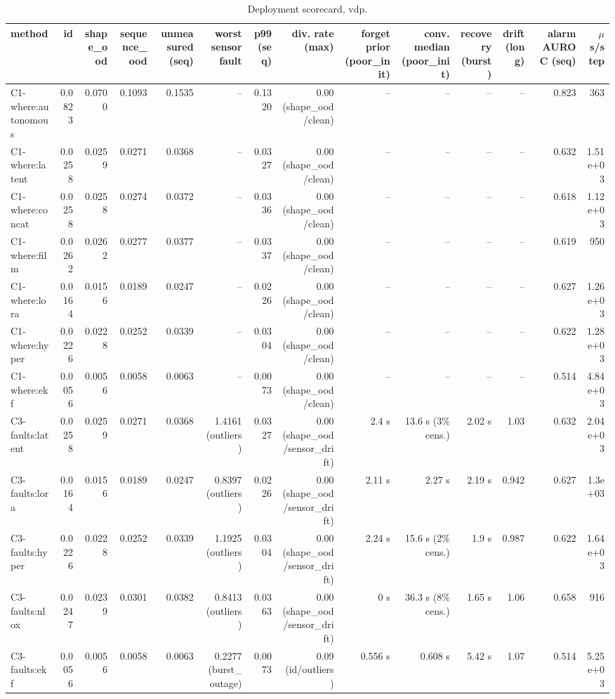 \begin{table}[t]
\centering
\scriptsize
\caption{Deployment scorecard, vdp.}
\begin{tabular}{lrrrrrrrrrrrrr}
\toprule
method & id & shape\_ood & sequence\_ood & unmeasured (seq) & worst sensor fault & p99 (seq) & div. rate (max) & forget prior (poor\_init) & conv. median (poor\_init) & recovery (burst) & drift (long) & alarm AUROC (seq) & $\mu$s/step \\
\midrule
C1-where:autonomous & 0.0823 & 0.0700 & 0.1093 & 0.1535 & – & 0.1320 & 0.00 (shape\_ood/clean) & – & – & – & – & 0.823 & 363 \\
C1-where:latent & 0.0258 & 0.0259 & 0.0271 & 0.0368 & – & 0.0327 & 0.00 (shape\_ood/clean) & – & – & – & – & 0.632 & 1.51e+03 \\
C1-where:concat & 0.0258 & 0.0258 & 0.0274 & 0.0372 & – & 0.0336 & 0.00 (shape\_ood/clean) & – & – & – & – & 0.618 & 1.12e+03 \\
C1-where:film & 0.0262 & 0.0262 & 0.0277 & 0.0377 & – & 0.0337 & 0.00 (shape\_ood/clean) & – & – & – & – & 0.619 & 950 \\
C1-where:lora & 0.0164 & 0.0156 & 0.0189 & 0.0247 & – & 0.0226 & 0.00 (shape\_ood/clean) & – & – & – & – & 0.627 & 1.26e+03 \\
C1-where:hyper & 0.0226 & 0.0228 & 0.0252 & 0.0339 & – & 0.0304 & 0.00 (shape\_ood/clean) & – & – & – & – & 0.622 & 1.28e+03 \\
C1-where:ekf & 0.0056 & 0.0056 & 0.0058 & 0.0063 & – & 0.0073 & 0.00 (shape\_ood/clean) & – & – & – & – & 0.514 & 4.84e+03 \\
C3-faults:latent & 0.0258 & 0.0259 & 0.0271 & 0.0368 & 1.4161 (outliers) & 0.0327 & 0.00 (shape\_ood/sensor\_drift) & 2.4 s & 13.6 s (3\% cens.) & 2.02 s & 1.03 & 0.632 & 2.04e+03 \\
C3-faults:lora & 0.0164 & 0.0156 & 0.0189 & 0.0247 & 0.8397 (outliers) & 0.0226 & 0.00 (shape\_ood/sensor\_drift) & 2.11 s & 2.27 s & 2.19 s & 0.942 & 0.627 & 1.3e+03 \\
C3-faults:hyper & 0.0226 & 0.0228 & 0.0252 & 0.0339 & 1.1925 (outliers) & 0.0304 & 0.00 (shape\_ood/sensor\_drift) & 2.24 s & 15.6 s (2\% cens.) & 1.9 s & 0.987 & 0.622 & 1.64e+03 \\
C3-faults:nlox & 0.0247 & 0.0239 & 0.0301 & 0.0382 & 0.8413 (outliers) & 0.0363 & 0.00 (shape\_ood/sensor\_drift) & 0 s & 36.3 s (8\% cens.) & 1.65 s & 1.06 & 0.658 & 916 \\
C3-faults:ekf & 0.0056 & 0.0056 & 0.0058 & 0.0063 & 0.2277 (burst\_outage) & 0.0073 & 0.09 (id/outliers) & 0.556 s & 0.608 s & 5.42 s & 1.07 & 0.514 & 5.25e+03 \\

\end{tabular}
\end{table}

